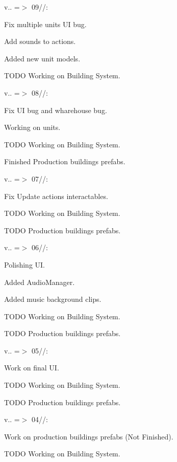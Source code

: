 v.. =\texorpdfstring{$>$}{>} 09//:\+
\begin{DoxyItemize}
\item Fix multiple units UI bug.
\item Add sounds to actions.
\item Added new unit models.
\item TODO Working on Building System.
\end{DoxyItemize}

v.. =\texorpdfstring{$>$}{>} 08//:\+
\begin{DoxyItemize}
\item Fix UI bug and wharehouse bug.
\item Working on units.
\item TODO Working on Building System.
\item Finished Production buildings prefabs.
\end{DoxyItemize}

v.. =\texorpdfstring{$>$}{>} 07//:\+
\begin{DoxyItemize}
\item Fix Update actions interactables.
\item TODO Working on Building System.
\item TODO Production buildings prefabs.
\end{DoxyItemize}

v.. =\texorpdfstring{$>$}{>} 06//:\+
\begin{DoxyItemize}
\item Polishing UI.
\item Added Audio\+Manager.
\item Added music background clips.
\item TODO Working on Building System.
\item TODO Production buildings prefabs.
\end{DoxyItemize}

v.. =\texorpdfstring{$>$}{>} 05//:\+
\begin{DoxyItemize}
\item Work on final UI.
\item TODO Working on Building System.
\item TODO Production buildings prefabs.
\end{DoxyItemize}

v.. =\texorpdfstring{$>$}{>} 04//:\+
\begin{DoxyItemize}
\item Work on production buildings prefabs (Not Finished).
\item TODO Working on Building System.
\end{DoxyItemize}

